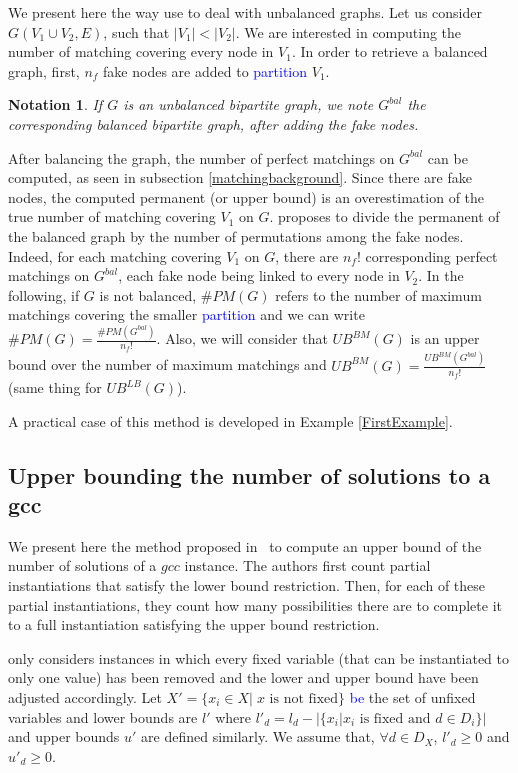 \documentclass[jair,twoside,11pt,theapa]{article}
\newtheorem*{notation}{Notation}
\newcommand{\minor}[1]{\textcolor{blue}{#1}}
\newcommand{\adjustedX}{X'}
\newcommand{\var}[1]{x_{#1}}
\newcommand{\low}{l}
\newcommand{\adjustedlow}{\low'}
\newcommand{\up}{u}
\newcommand{\adjustedup}{\up'}
\begin{document}
We present here the way \cite{PesantQZ12} use to deal with unbalanced graphs.
Let us consider $G(V_1 \cup V_2, E)$, such that $|V_1| < |V_2|$. We are interested in computing the number of matching covering every node in $V_1$. In order to retrieve a balanced graph, first, $n_f$ fake nodes are added to \minor{partition} $V_1$.%

\begin{notation}
	If $G$ is an unbalanced bipartite graph, we note $G^{bal}$ the corresponding balanced bipartite graph, after adding the fake nodes.
\end{notation}


After balancing the graph, the number of perfect matchings on $G^{bal}$ can be computed, as seen in subsection \ref{matchingbackground}. Since there are fake nodes, the computed permanent (or upper bound) is an overestimation of the true number of matching covering $V_1$ on $G$. \cite{PesantQZ12} proposes to divide the permanent of the balanced graph by the number of permutations among the fake nodes. Indeed, for each matching covering $V_1$ on $G$, there are $n_f!$ corresponding perfect matchings on $G^{bal}$, each fake node being linked to every node in $V_2$. 
In the following, if $G$ is not balanced, $\#PM(G)$ refers to the number of maximum matchings covering the smaller \minor{partition} and we can write $\#PM(G) = \frac{\#PM(G^{bal})}{n_f!}$. Also, we will consider that $UB^{BM}(G)$ is an upper bound over the number of maximum matchings and $UB^{BM}(G) = \frac{UB^{BM}(G^{bal})}{n_f!}$ (same thing for $UB^{LB}(G)$).

A practical case of this method is developed in Example \ref{FirstExample}.


\subsection{ Upper bounding the number of solutions to a gcc}
\label{stateoftheartPesant}
We present here the method proposed in~\cite{PesantQZ12} to compute an upper bound of the number of solutions of a $gcc$ instance. The authors first count partial instantiations that satisfy the lower bound restriction. Then, for each of these partial instantiations, they count how many possibilities there are to complete it to a full instantiation satisfying the upper bound restriction.

\cite{PesantQZ12} only considers instances in which every fixed variable (that can be instantiated to only one value) has been removed and the lower and upper bound have been adjusted accordingly. Let $ \adjustedX = \lbrace \var{i} \in X | \; \var{} \; \text{is not fixed} \rbrace$ \minor{be} the set of unfixed variables and lower bounds are $\adjustedlow$ where $\adjustedlow_d = \low_d-|\lbrace \var{i} | \var{i} \text{ is fixed and } d \in D_i \rbrace|$ and upper bounds $\adjustedup$ are defined similarly. We assume that, $\forall d \in D_X$, $l'_d \geq 0$ and $u'_d \geq 0$.
\end{document}
